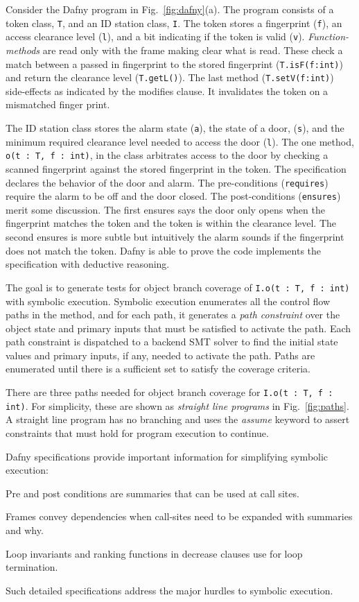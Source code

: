 \documentclass[11pt,onecolumn,notitlepage]{article}
\newcommand{\figref}[1]{Fig.~\ref{#1}}
\begin{document}
Consider the Dafny program in \figref{fig:dafny}(a). The program consists of a token class, \texttt{T}, and an ID station class, \texttt{I}. The token stores a fingerprint (\texttt{f}), an access clearance level (\texttt{l}), and a bit indicating if the token is valid (\texttt{v}). \emph{Function-methods} are read only with the frame making clear what is read. These check a match between a passed in fingerprint to the stored fingerprint (\texttt{T.isF(f:int)}) and return the clearance level (\texttt{T.getL()}). The last method (\texttt{T.setV(f:int)}) side-effects as indicated by the modifies clause. It invalidates the token on a mismatched finger print.

The ID station class stores the alarm state (\texttt{a}), the state of a door, (\texttt{s}), and the minimum required clearance level needed to access the door (\texttt{l}). The one method, \texttt{o(t : T, f : int)}, in the class arbitrates access to the door by checking a scanned fingerprint against the stored fingerprint in the token. The specification declares the behavior of the door and alarm. The pre-conditions (\texttt{requires}) require the alarm to be off and the door closed. The post-conditions (\texttt{ensures}) merit some discussion. The first ensures says the door only opens when the fingerprint matches the token and the token is within the clearance level. The second ensures is more subtle but intuitively the alarm sounds if the fingerprint does not match the token. Dafny is able to prove the code implements the specification with deductive reasoning.

The goal is to generate tests for object branch coverage of \texttt{I.o(t : T, f : int)} with symbolic execution. Symbolic execution enumerates all the control flow paths in the method, and for each path, it generates a \emph{path constraint} over the object state and primary inputs that must be satisfied to activate the path. Each path constraint is dispatched to a backend SMT solver to find the initial state values and primary inputs, if any, needed to activate the path. Paths are enumerated until there is a sufficient set to satisfy the coverage criteria.

There are three paths needed for object branch coverage for \texttt{I.o(t : T, f : int)}. For simplicity, these are shown as \emph{straight line programs} in \figref{fig:paths}. A straight line program has no branching and uses the \emph{assume} keyword to assert constraints that must hold for program execution to continue. 

Dafny specifications provide important information for simplifying symbolic execution:
\begin{compactitem}
  \item Pre and post conditions are summaries that can be used at call sites.
  \item Frames convey dependencies when call-sites need to be expanded with summaries and why.
  \item Loop invariants and ranking functions in decrease clauses use for loop termination.
\end{compactitem}
Such detailed specifications address the major hurdles to symbolic execution.
\end{document}
